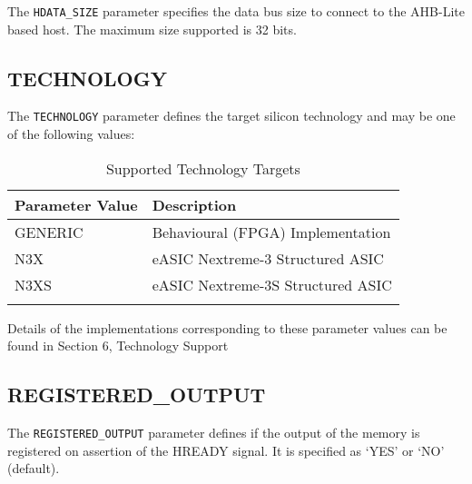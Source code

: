 The \texttt{HDATA\_SIZE} parameter specifies the data bus size to connect to 
the AHB-Lite based host. The maximum size supported is 32 bits.

 \subsection{TECHNOLOGY}\label{technology}

The \texttt{TECHNOLOGY} parameter defines the target silicon technology and 
may be one of the following values:

\begin{longtable}[]{@{}ll@{}}
	\toprule
	Parameter Value & Description\tabularnewline
	\midrule
	\endhead
	GENERIC & Behavioural (FPGA) Implementation\tabularnewline
	N3X & eASIC Nextreme-3 Structured ASIC\tabularnewline
	N3XS & eASIC Nextreme-3S Structured ASIC\tabularnewline
	\bottomrule
	\caption{Supported Technology Targets}
\end{longtable}

Details of the implementations corresponding to these parameter values can be found in Section 6, Technology Support

 \subsection{REGISTERED\_OUTPUT}\label{registered_output}

The \texttt{REGISTERED\_OUTPUT} parameter defines if the output of the memory 
is registered on assertion of the HREADY signal. It is specified as 
`YES' or `NO' (default).
